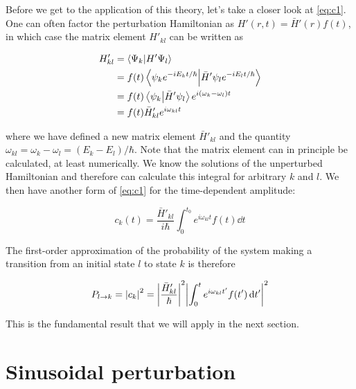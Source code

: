 Before we get to the application of this theory, let's take a closer look at \autoref{eq:c1}. 
One can often factor the perturbation Hamiltonian as $H'(r,t) = \bar{H}'(r)f(t)$, in which case the matrix element $H'_{kl}$ can be written as

\begin{align*}
	H'_{kl} &= \braket{\Psi_k}{H'\Psi_l} \\
	&= f(t) \braket{\psi_ke^{-iE_kt/\hbar}}{\bar{H}'\psi_le^{-iE_lt/\hbar}} \\
	&= f(t) \braket{\psi_k}{\bar{H}'\psi_l}e^{i(\omega_k-\omega_l)t} \\
	&= f(t) \bar{H}'_{kl} e^{i\omega_{kl}t} 
\end{align*}

\noindent where we have defined a new matrix element $\bar{H}'_{kl}$ and the quantity $\omega_{kl} = \omega_k - \omega_l = (E_k - E_l)/\hbar$. 
Note that the matrix element can in principle be calculated, at least numerically. 
We know the solutions of the unperturbed Hamiltonian and therefore can calculate this integral for arbitrary $k$ and $l$. 
We then have another form of \autoref{eq:c1} for the time-dependent amplitude:

\begin{equation}
	\boxed{c_k(t) = \frac{\bar{H}'_{kl}}{i\hbar} \int_{0}^{t_0} e^{i\omega_{kl}t} f(t) \dd{t}} \label{eq:c1-sep}
\end{equation}

The first-order approximation of the probability of the system making a transition from an initial state $l$ to state $k$ is therefore

\begin{tcolorbox}[title = Transition probability] \vspace{-2ex}
	\begin{equation}
		P_{l \rightarrow k} = \abs{c_k}^2 = \abs{\frac{\bar{H}'_{kl}}{\hbar}}^2 \abs{\int_{0}^{t} e^{i\omega_{kl}t'} f(t') \dd{t'}}^2
	\end{equation}
\end{tcolorbox}

This is the fundamental result that we will apply in the next section.


\section{Sinusoidal perturbation}

